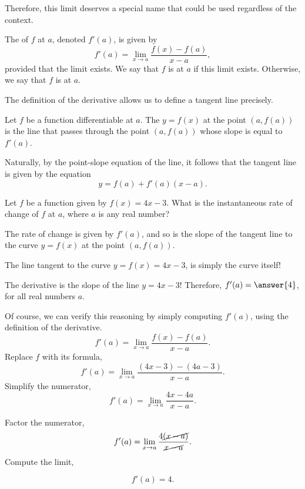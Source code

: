 \documentclass{ximera}
\begin{document}
    Therefore, this limit deserves a special name that could be used regardless of the context.
    \begin{definition}
  The  of $f$ at $a$, denoted $f'(a)$, is given by
  \[
 f'(a) = \lim_{x\to a} \frac{f(x) - f(a)}{x-a},
  \]
 provided that the limit exists. We say that $f$ is 
  at $a$ if  this limit exists. Otherwise,  we say that  $f$ is  at $a$.
\end{definition}

The definition of the derivative allows us to define a tangent line precisely.
  \begin{definition}
  Let $f$ be a function differentiable at $a$. The  $y=f(x)$ at the point $(a,f(a))$ is the line that passes through the point $(a,f(a))$ whose slope is equal to $f'(a)$.
    \end{definition}
  
  Naturally, by the point-slope equation of the line, it follows that the tangent line is given by the equation
  \[
 y = f(a)+f'(a)(x-a).
  \]

      \begin{question}
            Let $f$ be a function given by $f(x) = 4x-3$.
	What is the instantaneous rate of change of $f$ at $a$, where $a$ is any real number?
	\begin{hint}
		The rate of change is given by $f'(a)$, and so is the slope of the tangent line to the curve $y=f(x)$ at the point $(a,f(a))$.
	\end{hint}
	\begin{hint}
		The line tangent to the curve $y=f(x) = 4x-3$, is simply the curve itself!
	\end{hint}
	\begin{prompt}
		The derivative is the slope of the line $y= 4x-3$! Therefore,  $f'(a)=\answer{4}$, for all real numbers $a$.
	\end{prompt}
	\begin{hint}
		 Of course, we can verify this reasoning by simply computing $f'(a)$, using the definition of the derivative.
		 \[
 f'(a) = \lim_{x\to a} \frac{f(x) - f(a)}{x-a}.
  \]
Replace $f$ with its formula,
		\[
 f'(a) = \lim_{x\to a} \frac{(4x-3)-(4a-3)}{x-a}.
  \]
		Simplify the numerator,
			\[
 f'(a) = \lim_{x\to a} \frac{4x-4a}{x-a}.
  \]

		Factor the numerator,
		\[
 f'(a) = \lim_{x\to a} \frac{4\cancel{(x-a)}}{\cancel{x-a}}.
  \]
 Compute the limit,

		\[
 f'(a) =4.
  \]

			\end{hint}
\end{question}
\end{document}

